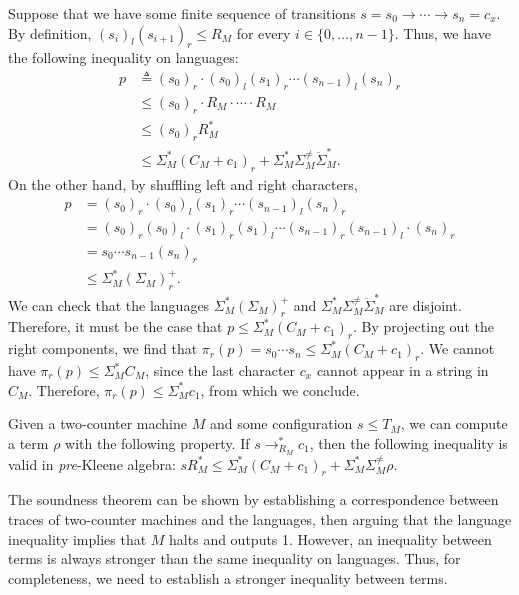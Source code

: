 \documentclass[a4paper,UKenglish,cleveref, autoref, thm-restate]{lipics-v2021}
\begin{document}
\begin{proofEnd}
  Suppose that we have some finite sequence of transitions
  $s = s_0  \to   \cdots   \to  s_n = c_x$.  By definition, $(s_i)_l(s_{i+1})_r  \leq  R_M$ for
  every $i  \in  \{0, \ldots ,n-1\}$.  Thus, we have the following inequality on languages:
  \begin{align*}
    p
    &  \triangleq  (s_0)_r  \cdot  (s_0)_l(s_1)_r  \cdots  (s_{n-1})_l(s_n)_r \\
    &  \leq  (s_0)_r  \cdot  R_M  \cdot   \cdots   \cdot  R_M \\
    &  \leq  (s_0)_rR_M^* \\
    &  \leq   \Sigma _M^*(C_M + c_1)_r +  \Sigma _M^* \Sigma _M^{ \neq }\ddot{ \Sigma }_M^*.
  \end{align*}
  On the other hand, by shuffling left and right characters,
  \begin{align*}
    p
    & = (s_0)_r  \cdot  (s_0)_l(s_1)_r  \cdots  (s_{n-1})_l(s_n)_r \\
    & = (s_0)_r(s_0)_l  \cdot  (s_1)_r(s_1)_l  \cdots  (s_{n-1})_r(s_{n-1})_l  \cdot  (s_n)_r \\
    & = s_0  \cdots  s_{n-1} (s_{n})_r \\
    &  \leq   \Sigma _M^*( \Sigma _M)_r^+.
  \end{align*}
  We can check that the languages $ \Sigma _M^*( \Sigma _M)_r^+$ and
  $ \Sigma _M^* \Sigma _M^{ \neq }\ddot{ \Sigma }_M^*$ are disjoint.  Therefore, it must be the case that
  $p  \leq   \Sigma _M^*(C_M + c_1)_r$.  By projecting out the right components, we find that
  $ \pi _r(p) = s_0  \cdots  s_n  \leq   \Sigma _M^*(C_M + c_1)_r$.  We cannot have
  $ \pi _r(p)  \leq   \Sigma _M^*C_M$, since the last character $c_x$ cannot appear in a string
  in $C_M$.  Therefore, $ \pi _r(p)  \leq   \Sigma _M^*c_1$, from which we conclude.
\end{proofEnd}


\begin{theorem}[Completeness]
  \label{thm:completeness}
  Given a two-counter machine $M$ and some configuration $s  \leq  T_M$, we can
  compute a term $ \rho $ with the following property.  If $s  \to _{R_M}^* c_1$, then
  the following inequality is valid in \emph{pre}-Kleene algebra:
  \( sR_M^*  \leq   \Sigma _M^*(C_M + c_1)_r +  \Sigma _M^* \Sigma _M^{ \neq } \rho . \)
\end{theorem}

The soundness theorem can be shown by establishing a correspondence between
traces of two-counter machines and the languages, then arguing that the language
inequality implies that \(M\) halts and outputs 1.  However, an inequality
between terms is always stronger than the same inequality on languages.  Thus,
for completeness, we need to establish a stronger inequality between terms.
\end{document}

